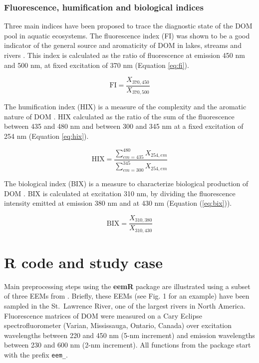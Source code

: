 \documentclass[]{book}
\theoremstyle{definition}
\theoremstyle{definition}
\theoremstyle{remark}
\begin{document}
\subsubsection{Fluorescence, humification and biological
indices}\label{fluorescence-humification-and-biological-indices}

Three main indices have been proposed to trace the diagnostic state of
the DOM pool in aquatic ecosystems. The fluorescence index (FI) was
shown to be a good indicator of the general source and aromaticity of
DOM in lakes, streams and rivers \citep{McKnight2001}. This index is
calculated as the ratio of fluorescence at emission 450 nm and 500 nm,
at fixed excitation of 370 nm (Equation \eqref{eq:fi}).

\begin{equation}
\text{FI} = \frac{X_{370, 450}}{X_{370, 500}}
\label{eq:fi}
\end{equation}

The humification index (HIX) is a measure of the complexity and the
aromatic nature of DOM \citep{Ohno2002}. HIX calculated as the ratio of
the sum of the fluorescence between 435 and 480 nm and between 300 and
345 nm at a fixed excitation of 254 nm (Equation \eqref{eq:hix}).

\begin{equation}
\text{HIX} = \frac{\sum\limits_{em = 435}^{480} X_{254, em}}{\sum\limits_{em = 300}^{345} X_{254, em}}
\label{eq:hix}
\end{equation}

The biological index (BIX) is a measure to characterize biological
production of DOM \citep{Huguet2009}. BIX is calculated at excitation
310 nm, by dividing the fluorescence intensity emitted at emission 380
nm and at 430 nm (Equation (\eqref{eq:bix})).

\begin{equation}
\text{BIX} = \frac{X_{310, 380}}{X_{310, 430}}
\label{eq:bix}
\end{equation}

\section{R code and study case}\label{r-code-and-study-case}

Main preprocessing steps using the \textbf{eemR} package are illustrated
using a subset of three EEMs from \citep{Massicotte2011EA}. Briefly,
these EEMs (see Fig. 1 for an example) have been sampled in the
St.~Lawrence River, one of the largest rivers in North America.
Fluorescence matrices of DOM were measured on a Cary Eclipse
spectrofluorometer (Varian, Mississauga, Ontario, Canada) over
excitation wavelengths between 220 and 450 nm (5-nm increment) and
emission wavelengths between 230 and 600 nm (2-nm increment). All
functions from the package start with the prefix
\texttt{\textquotesingle{}eem\_\textquotesingle{}}.
\end{document}
